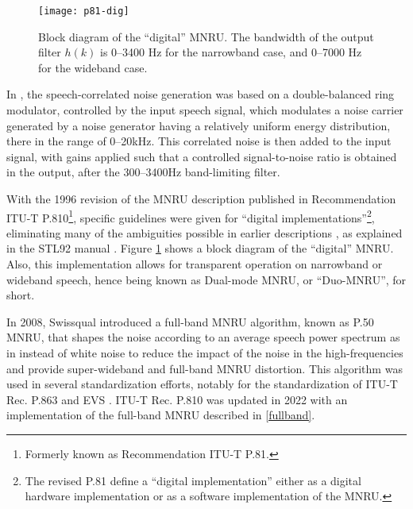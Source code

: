 \begin{figure}[hpbt]
  \begin{center}
    \texttt{[image: p81-dig]}
  \end{center}
  \caption{Block diagram of the ``digital'' MNRU. The bandwidth of the output filter $h(k)$ is 0--3400 Hz for the
  narrowband case, and 0--7000 Hz for the wideband case. \label{1/P.810}}
 \end{figure}

In \cite{Q001.02.04.02}, the speech-correlated noise generation was based on a double-balanced ring modulator,
controlled by the input speech signal, which modulates a noise carrier generated by a noise generator having a
relatively uniform energy distribution, there in the range of 0--20kHz.
This correlated noise is then added to the input signal, with gains applied such that a controlled signal-to-noise
ratio is obtained in the output, after the 300--3400Hz band-limiting filter.

With the 1996 revision of the MNRU description published in Recommendation ITU-T P.810\footnote{\SF Formerly known as
Recommendation ITU-T P.81.}, specific guidelines were given for ``digital implementations''\footnote{\SF The revised
P.81 define a ``digital implementation'' either as a digital hardware implementation or as a software implementation of
the MNRU.}, eliminating many of the ambiguities possible in earlier descriptions \cite{Old-P.81}, as explained in the
STL92 manual \cite[Chapter 8]{STL92-Manual}. Figure \ref{1/P.810} shows a block diagram of the ``digital'' MNRU.
Also, this implementation allows for transparent operation on narrowband or wideband speech, hence being known as
Dual-mode MNRU, or ``Duo-MNRU'', for short.

In 2008, Swissqual introduced a full-band MNRU algorithm, known as P.50 MNRU, that shapes the noise according to an
average speech power spectrum as in \cite{P.50} instead of white noise to reduce the impact of the noise in the
high-frequencies and provide super-wideband and full-band MNRU distortion. This algorithm was used in several
standardization efforts, notably for the standardization of ITU-T Rec. P.863 \cite{P.863} and EVS \cite{EVS}.
ITU-T Rec. P.810 was updated in 2022 with an implementation of the full-band MNRU described in \ref{fullband}.


